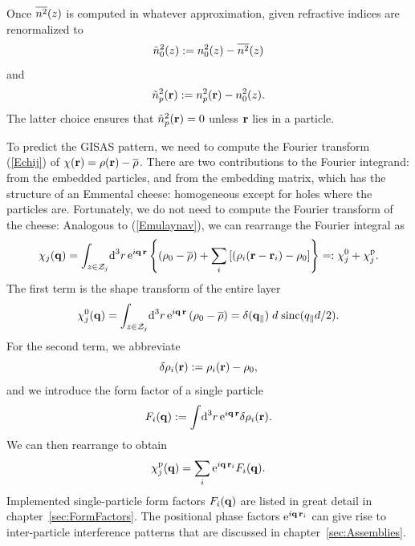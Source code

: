 
Once $\overline{n^2}(z)$ is computed in whatever approximation,
given refractive indices are renormalized to
\begin{equation}
    \tilde{n}_0^2(z) := n_0^2(z) - \overline{n^2}(z)
\end{equation}
and    
\begin{equation}
    \tilde{n}_p^2(\mathbf{r}) := n_p^2(\mathbf{r}) - n_0^2(z).
\end{equation}
The latter choice ensures that $\tilde{n}_p^2(\mathbf{r})=0$ unless
$\mathbf{r}$ lies in a particle.

To predict the GISAS pattern,
we need to compute the Fourier transform (\ref{Echij}) of
$\chi(\mathbf{r})=\rho(\mathbf{r})-\overline{\rho}$.
There are two contributions to the Fourier integrand:
from the embedded particles, and from the embedding matrix,
which has the structure of an Emmental cheese:
homogeneous except for holes where the particles are.
Fortunately, we do not need to compute the Fourier transform
of the cheese:
Analogous to (\ref{Emulaynav}),
we can rearrange the Fourier integral as
\begin{equation}\label{Echijre}
  \chi_j(\mathbf{q})
  = \int_{z\in\mathcal{Z}_j}\!\text{d}^3r\, \text{e}^{i\mathbf{q}\,\mathbf{r}}
    \left\{ \left(\rho_0-\overline{\rho}\right)
           + \sum_i \left[(\rho_i(\mathbf{r}-\mathbf{r}_i)-\rho_0\right] \right\}
  =: \chi^0_j + \chi^\text{p}_j.
\end{equation}
The first term is the shape transform of the entire layer
\begin{equation}
  \chi^0_j(\mathbf{q})
   = \int_{z\in\mathcal{Z}_j}\!\text{d}^3r\, \text{e}^{i\mathbf{q}\,\mathbf{r}}
      \left(\rho_0-\overline{\rho}\right)
   = \delta(\mathbf{q}_\parallel)\;d\;\text{sinc}(q_\parallel d/2).
\end{equation}
%
For the second term,
we abbreviate
\begin{equation}
  \delta\rho_i(\mathbf{r}):=\rho_i(\mathbf{r})-\rho_0,
\end{equation}
and we introduce the form factor of a single particle
\begin{equation}
  F_i(\mathbf{q}) := \int\!\text{d}^3r\, \text{e}^{i\mathbf{q}\,\mathbf{r}} \delta\rho_i(\mathbf{r}).
\end{equation}
We can then rearrange to obtain
\begin{equation}
  \chi^\text{p}_j(\mathbf{q})
  = \sum_i \text{e}^{i\mathbf{q}\,\mathbf{r}_i} F_i(\mathbf{q}).
\end{equation}
Implemented single-particle form factors $F_i(\mathbf{q})$
are listed in great detail in chapter~\ref{sec:FormFactors}.
The positional phase factors $\text{e}^{i\mathbf{q}\,\mathbf{r}_i}$
can give rise to inter-particle interference patterns
that are discussed in chapter~\ref{sec:Assemblies}.

